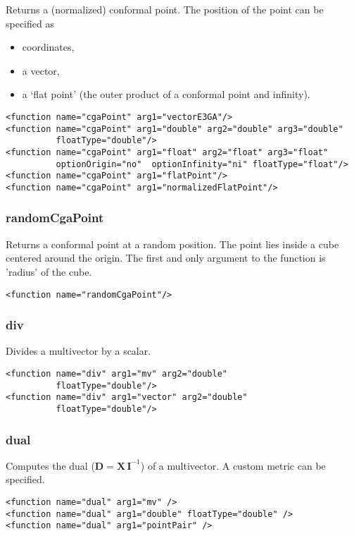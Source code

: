 \documentclass[10pt, a4paper]{article}
\newcommand{\gav}[1]{\ensuremath{\mathbf{#1}}}
\newcommand{\gp}{\,}
\newcommand{\inv}[1]{{#1}^{-1}}
\begin{document}
Returns a (normalized) conformal point. 
The position of the point can be specified as
\begin{itemize}
\item coordinates,
\item a vector,
\item a `flat point' (the outer product of a conformal point and infinity).
\end{itemize}
\begin{verbatim}
<function name="cgaPoint" arg1="vectorE3GA"/>
<function name="cgaPoint" arg1="double" arg2="double" arg3="double" 
          floatType="double"/>
<function name="cgaPoint" arg1="float" arg2="float" arg3="float" 
          optionOrigin="no"  optionInfinity="ni" floatType="float"/>
<function name="cgaPoint" arg1="flatPoint"/>
<function name="cgaPoint" arg1="normalizedFlatPoint"/>
\end{verbatim}

\subsubsection*{randomCgaPoint}

Returns a conformal point at a random position.
The point lies inside a cube centered around the origin.
The first and only argument to the function is 'radius' of the cube.
\begin{verbatim}
<function name="randomCgaPoint"/>
\end{verbatim}

\subsubsection*{div}

Divides a multivector by a scalar.
\begin{verbatim}
<function name="div" arg1="mv" arg2="double" 
          floatType="double"/>
<function name="div" arg1="vector" arg2="double" 
          floatType="double"/>
\end{verbatim}

\subsubsection*{dual}

Computes the dual ($\gav{D} = \gav{X} \gp \inv{\gav{I}}$) of a multivector. A custom metric can be specified.
\begin{verbatim}
<function name="dual" arg1="mv" />
<function name="dual" arg1="double" floatType="double" />
<function name="dual" arg1="pointPair" />
\end{verbatim}
\end{document}
